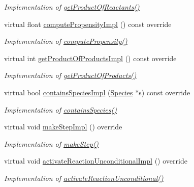 \begin{DoxyCompactItemize}
\begin{DoxyCompactList}\small\item\em Implementation of \hyperlink{classchem_1_1ReactionBase_a3a5f011161601e3501dd8752829b12f5}{get\-Product\-Of\-Reactants()} \end{DoxyCompactList}\item 
virtual float \hyperlink{classchem_1_1Reaction_a16c2e5ad0e01e34c5abb6baf7d389841}{compute\-Propensity\-Impl} () const override
\begin{DoxyCompactList}\small\item\em Implementation of \hyperlink{classchem_1_1ReactionBase_a3e91b5d0c44fcb81bb17d2d0fee7947d}{compute\-Propensity()} \end{DoxyCompactList}\item 
virtual int \hyperlink{classchem_1_1Reaction_a1be37929622322dde8fc0efbee50fb36}{get\-Product\-Of\-Products\-Impl} () const override
\begin{DoxyCompactList}\small\item\em Implementation of \hyperlink{classchem_1_1ReactionBase_ab8da881092b40a3c3c4f724fa23f7422}{get\-Product\-Of\-Products()} \end{DoxyCompactList}\item 
virtual bool \hyperlink{classchem_1_1Reaction_a1add1afc001452533140c0130ff0e2e3}{contains\-Species\-Impl} (\hyperlink{classchem_1_1Species}{Species} $\ast$s) const override
\begin{DoxyCompactList}\small\item\em Implementation of \hyperlink{classchem_1_1ReactionBase_a35e914ed47c4107c86ef18f0f8ddb9e6}{contains\-Species()} \end{DoxyCompactList}\item 
virtual void \hyperlink{classchem_1_1Reaction_ad7aee2091f1da5b1988605b084f6640a}{make\-Step\-Impl} () override
\begin{DoxyCompactList}\small\item\em Implementation of \hyperlink{classchem_1_1ReactionBase_acb5575b08ca39fc6dd7a571fb246806b}{make\-Step()} \end{DoxyCompactList}\item 
virtual void \hyperlink{classchem_1_1Reaction_a9ce9262242def224e7ed3878e836a5ac}{activate\-Reaction\-Unconditional\-Impl} () override
\begin{DoxyCompactList}\small\item\em Implementation of \hyperlink{classchem_1_1ReactionBase_a8eb302e62acd94d58f4b8a1301d83a5e}{activate\-Reaction\-Unconditional()} \end{DoxyCompactList}\item 

\end{DoxyCompactItemize}
